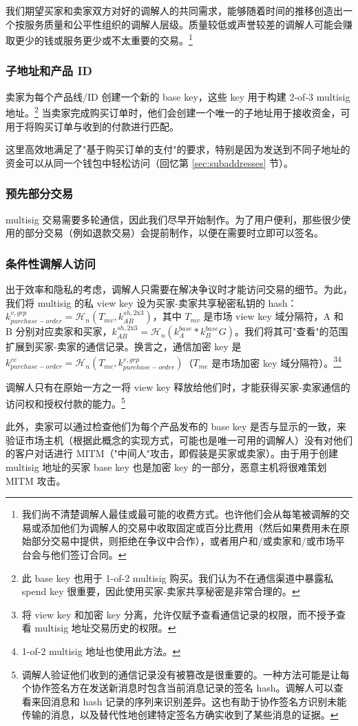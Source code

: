 我们期望买家和卖家双方对好的调解人的共同需求，能够随着时间的推移创造出一个按服务质量和公平性组织的调解人层级。质量较低或声誉较差的调解人可能会赚取更少的钱或服务更少或不太重要的交易。\footnote{我们尚不清楚调解人最佳或最可能的收费方式。也许他们会从每笔被调解的交易或添加他们为调解人的交易中收取固定或百分比费用（然后如果费用未在原始部分交易中提供，则拒绝在争议中合作），或者用户和/或卖家和/或市场平台会与他们签订合同。}

\subsubsection*{子地址和产品 ID}

卖家为每个产品线/ID 创建一个新的 base key，这些 key 用于构建 2-of-3 multisig 地址。\footnote{此 base key 也用于 1-of-2 multisig 购买。我们认为不在通信渠道中暴露私 spend key 很重要，因此使用买家-卖家共享秘密是非常合理的。} 当卖家完成购买订单时，他们会创建一个唯一的子地址用于接收资金，可用于将购买订单与收到的付款进行匹配。

这里高效地满足了"基于购买订单的支付"的要求，特别是因为发送到不同子地址的资金可以从同一个钱包中轻松访问（回忆第 \ref{sec:subaddresses} 节）。

\subsubsection*{预先部分交易}

multisig 交易需要多轮通信，因此我们尽早开始制作。为了用户便利，那些很少使用的部分交易（例如退款交易）会提前制作，以便在需要时立即可以签名。

\subsubsection*{条件性调解人访问}

出于效率和隐私的考虑，调解人只需要在解决争议时才能访问交易的细节。为此，我们将 multisig 的私 view key 设为买家-卖家共享秘密私钥的 hash：$k^{v,grp}_{purchase-order} = \mathcal{H}_n(T_{mv},k^{sh,\textrm{2x3}}_{AB})$，其中 $T_{mv}$ 是市场 view key 域分隔符，A 和 B 分别对应卖家和买家，$k^{sh,\textrm{2x3}}_{AB} = \mathcal{H}_n(k^{base}_{A}*k^{base}_{B} G)$。我们将其可"查看"的范围扩展到买家-卖家的通信记录。换言之，通信加密 key 是 $k^{ce}_{purchase-order} = \mathcal{H}_n(T_{me},k^{v,grp}_{purchase-order})$（$T_{me}$ 是市场加密 key 域分隔符）。\footnote{将 view key 和加密 key 分离，允许仅赋予查看通信记录的权限，而不授予查看 multisig 地址交易历史的权限。}\footnote{1-of-2 multisig 地址也使用此方法。}

调解人只有在原始一方之一将 view key 释放给他们时，才能获得买家-卖家通信的访问权和授权付款的能力。\footnote{调解人验证他们收到的通信记录没有被篡改是很重要的。一种方法可能是让每个协作签名方在发送新消息时包含当前消息记录的签名 hash。调解人可以查看来回消息和 hash 记录的序列来识别差异。这也有助于协作签名方识别未能传输的消息，以及替代性地创建特定签名方确实收到了某些消息的证据。}

此外，卖家可以通过检查他们为每个产品发布的 base key 是否与显示的一致，来验证市场主机（根据此概念的实现方式，可能也是唯一可用的调解人）没有对他们的客户对话进行 MITM（"中间人"攻击，即假装是买家或卖家）。由于用于创建 multisig 地址的买家 base key 也是加密 key 的一部分，恶意主机将很难策划 MITM 攻击。
